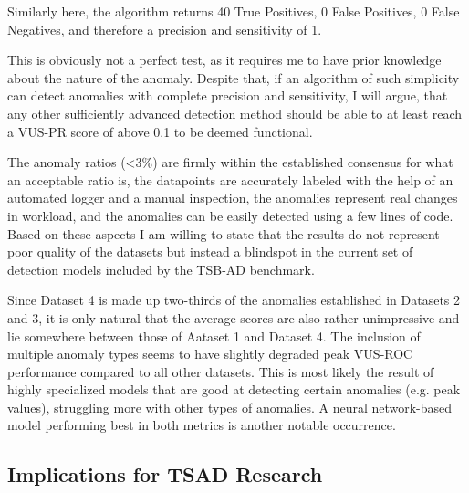 \documentclass[12pt,oneside]{article}
\begin{document}
\par
Similarly here, the algorithm returns 40 True Positives, 0 False Positives, 0 False Negatives, and therefore a precision and sensitivity of 1. \par
This is obviously not a perfect test, as it requires me to have prior knowledge about the nature of the anomaly. Despite that, if an algorithm of such simplicity can detect anomalies with complete precision and sensitivity, I will argue, that any other sufficiently advanced detection method should be able to at least reach a VUS-PR score of above 0.1 to be deemed functional.\par
The anomaly ratios (<3\%) are firmly within the established consensus for what an acceptable ratio is, the datapoints are accurately labeled with the help of an automated logger and a manual inspection, the anomalies represent real changes in workload, and the anomalies can be easily detected using a few lines of code. Based on these aspects I am willing to state that the results do not represent poor quality of the datasets but instead a blindspot in the current set of detection models included by the TSB-AD benchmark. \par
Since Dataset 4 is made up two-thirds of the anomalies established in Datasets 2 and 3, it is only natural that the average scores are also rather unimpressive and lie somewhere between those of Aataset 1 and Dataset 4. The inclusion of multiple anomaly types seems to have slightly degraded peak VUS-ROC performance compared to all other datasets. This is most likely the result of highly specialized models that are good at detecting certain anomalies (e.g. peak values), struggling more with other types of anomalies. A neural network-based model performing best in both metrics is another notable occurrence.

\subsection{Implications for TSAD Research}
\end{document}
